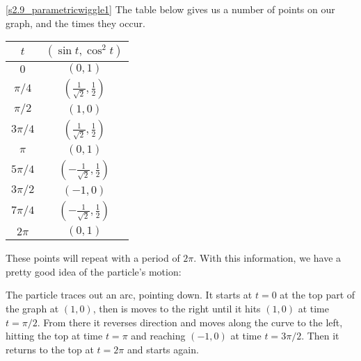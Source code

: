 \begin{solution}

\eqref{s2.9_parametricwiggle1}
The table below gives us a number of points on our graph, and the times they occur.

\begin{center}\begin{tabular}{c|c}
$t$&$(\sin t,\cos^2 t)$\\ \hline
$0$&$(0,1)$\\
$\pi/4$&$(\frac{1}{\sqrt{2}},\frac{1}{2})$\\
$\pi/2$&$(1,0)$\\
$3\pi/4$&$(\frac{1}{\sqrt{2}},\frac{1}{2})$\\
$\pi$&$(0,1)$\\
$5\pi/4$&$(-\frac{1}{\sqrt{2}},\frac{1}{2})$\\
$3\pi/2$&$(-1,0)$\\
$7\pi/4$&$(-\frac{1}{\sqrt{2}},\frac{1}{2})$\\
$2\pi$&$(0,1)$
\end{tabular}\end{center}

These points will repeat with a period of $2\pi$. With this information, we have a pretty good idea of the particle's motion:

\begin{center}\end{center}

The particle traces out an arc, pointing down. It starts at $t=0$ at the top part of the graph at $(1,0)$, then is moves to the right until it hits $(1,0)$ at time $t=\pi/2$. From there it reverses direction and moves along the curve to the left, hitting the top at time $t=\pi$ and reaching $(-1,0)$ at time $t=3\pi/2$. Then it returns to the top at $t=2\pi$ and starts again.


\end{solution}
